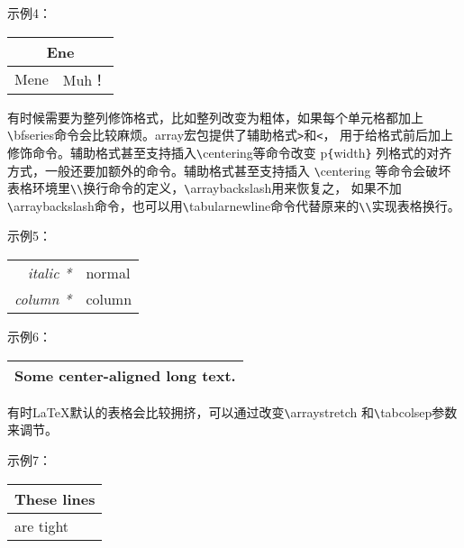 \documentclass[UTF8]{ctexart}
\begin{document}
示例4：
\newline

\begin{tabular}{|c|c|}
\hline
\multicolumn{2}{|c|}{Ene} \\
\hline
Mene & Muh！\\
\hline
\end{tabular}
\newline

\qquad 有时候需要为整列修饰格式，比如整列改变为粗体，如果每个单元格都加上\texttt{\textbackslash}bfseries命令会比较麻烦。array宏包提供了辅助格式\texttt{>}和\texttt{<}，
用于给格式前后加上修饰命令。辅助格式甚至支持插入\texttt{\textbackslash}centering等命令改变 p\texttt{\{}width\texttt{\}} 列格式的对齐方式，一般还要加额外的命令。辅助格式甚至支持插入
\texttt{\textbackslash}centering 等命令会破坏表格环境里\texttt{\textbackslash}\texttt{\textbackslash}换行命令的定义，\texttt{\textbackslash}arraybackslash用来恢复之，
如果不加\texttt{\textbackslash}arraybackslash命令，也可以用\texttt{\textbackslash}tabularnewline命令代替原来的\texttt{\textbackslash}\texttt{\textbackslash}实现表格换行。
\newline

示例5：
\newline

\begin{tabular}{>{\itshape}r<{*}l}
\hline
italic & normal \\
column & column \\
\hline
\end{tabular}
\newline

示例6：
\newline

\begin{tabular}
{>{\centering\arraybackslash}p{9em}}
\hline
Some center-aligned long text. \\
\hline
\end{tabular}
\newline

有时\LaTeX 默认的表格会比较拥挤，可以通过改变\texttt{\textbackslash}arraystretch 和\texttt{\textbackslash}tabcolsep参数来调节。
\newline

示例7：
\newline

\begin{tabular}{|l|}
\hline
These lines\\\hline
are tight\\\hline
\end{tabular}
\end{document}
